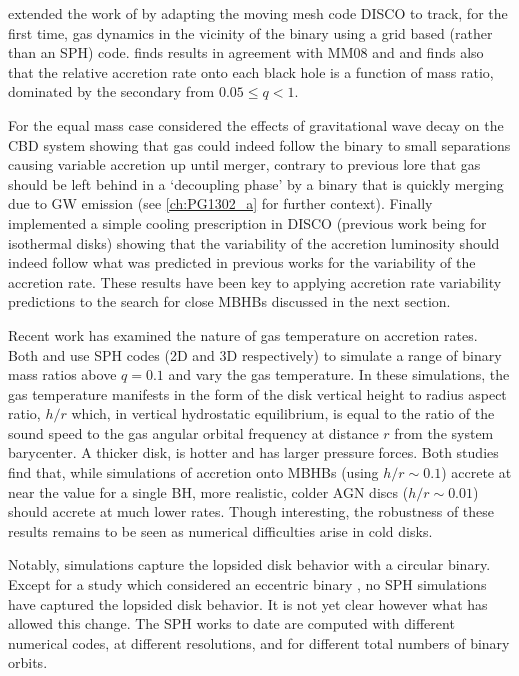 \citep{Farris:2014} extended the work of \citep{DHM:2013:MNRAS} by adapting the
moving mesh code DISCO \citep{Duffell:2011:TESS,
DuffellMHDDISCO:2016} to track, for the first time, gas dynamics in the
vicinity of the binary using a grid based (rather than an SPH)
code. \citep{Farris:2014} finds results in agreement with MM08 and
\citep{DHM:2013:MNRAS} and finds also that the relative accretion rate onto
each black hole is a function of mass ratio, dominated by the secondary from
$0.05 \leq q < 1$. 


For the equal mass case \citep{Farris:2015:GW} considered the effects of
gravitational wave decay on the CBD system showing that gas could indeed follow
the binary to small separations causing variable accretion up until merger,
contrary to previous lore that gas should be left behind in a `decoupling
phase' by a binary that is quickly merging due to GW emission (see
\ref{ch:PG1302_a} for further context). Finally \citep{Farris:2015:Cool}
implemented a simple cooling prescription in DISCO (previous work being for
isothermal disks) showing that the variability of the accretion luminosity
should indeed follow what was predicted in previous works for the variability
of the accretion rate. These results have been key to applying accretion rate
variability predictions to the search for close MBHBs discussed in the next
section.



Recent work has examined the nature of gas temperature on accretion rates.
Both \cite{YoungClarke:2015} and \cite{RagusaLodato:2016} use SPH codes (2D
and 3D respectively) to simulate a range of binary mass ratios above $q=0.1$
and vary the gas temperature. In these simulations, the gas temperature
manifests in the form of the disk vertical height to radius aspect ratio,
$h/r$ which, in vertical hydrostatic equilibrium, is equal to the ratio of the
sound speed to the gas angular orbital frequency at distance $r$ from the
system barycenter. A thicker disk, is hotter and has larger pressure forces.
Both studies find that, while simulations of accretion onto MBHBs (using $h/r \sim
0.1$) accrete at near the value for a single BH, more realistic, colder AGN
discs ($h/r \sim 0.01$) should accrete at much lower rates. Though
interesting, the robustness of these results remains to be seen as numerical
difficulties arise in cold disks.%


Notably, \citep{RagusaLodato:2016} simulations capture the lopsided disk
behavior with a circular binary. Except for a study which considered an
eccentric binary \citep{Dunhill+2015}, no SPH simulations have captured the
lopsided disk behavior. It is not yet clear however what has allowed this
change. The SPH works to date are computed with different numerical codes, at
different resolutions, and for different total numbers of binary orbits.

